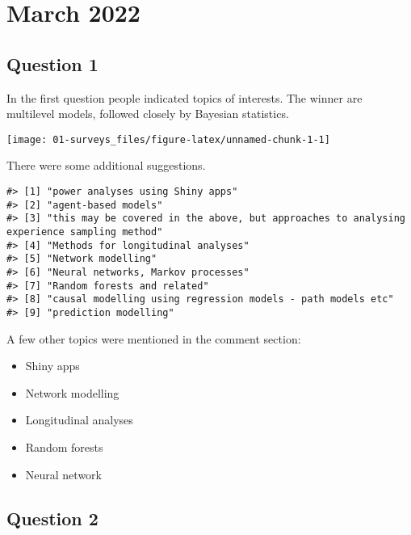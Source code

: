 \documentclass[
]{book}
\providecommand{\tightlist}{%
  \setlength{\itemsep}{0pt}\setlength{\parskip}{0pt}}
\begin{document}
\section{March 2022}\label{march-2022}

\subsection{Question 1}\label{question-1}

In the first question people indicated topics of interests. The winner are multilevel models, followed closely by Bayesian statistics.

\begin{center}\texttt{[image: 01-surveys\_files/figure-latex/unnamed-chunk-1-1]} \end{center}

There were some additional suggestions.

\begin{verbatim}
#> [1] "power analyses using Shiny apps"                                                         
#> [2] "agent-based models"                                                                      
#> [3] "this may be covered in the above, but approaches to analysing experience sampling method"
#> [4] "Methods for longitudinal analyses"                                                       
#> [5] "Network modelling"                                                                       
#> [6] "Neural networks, Markov processes"                                                       
#> [7] "Random forests and related"                                                              
#> [8] "causal modelling using regression models - path models etc"                              
#> [9] "prediction modelling"
\end{verbatim}

A few other topics were mentioned in the comment section:

\begin{itemize}
\tightlist
\item
  Shiny apps
\item
  Network modelling
\item
  Longitudinal analyses
\item
  Random forests
\item
  Neural network
\end{itemize}

\subsection{Question 2}\label{question-2}
\end{document}
